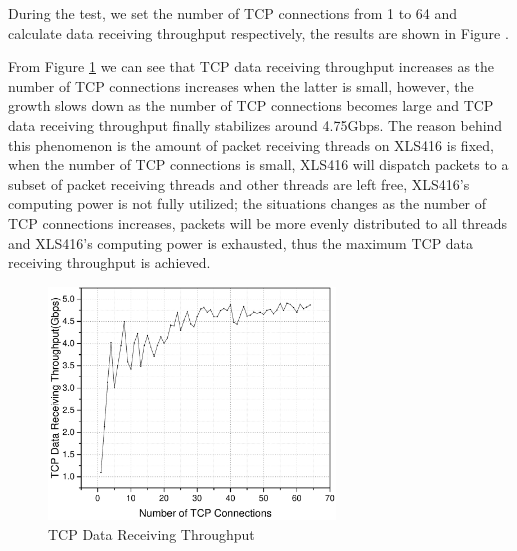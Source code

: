 \documentclass[conference]{IEEEtran}
\begin{document}
During the test, we set the number of TCP connections from 1 to 64 and calculate data receiving throughput respectively, the results are shown in Figure .

From Figure \ref{result} we can see that TCP data receiving throughput increases as the number of TCP connections increases when the latter is small, however, the growth slows down as the number of TCP connections becomes large and TCP data receiving throughput finally stabilizes around 4.75Gbps. The reason behind this phenomenon is the amount of packet receiving threads on XLS416 is fixed, when the number of TCP connections is small, XLS416 will dispatch packets to a subset of packet receiving threads and other threads are left free, XLS416's computing power is not fully utilized; the situations changes as the number of TCP connections increases, packets will be more evenly distributed to all threads and XLS416's computing power is exhausted, thus the maximum TCP data receiving throughput is achieved.
\begin{figure}[!t]
\centering
\includegraphics[width=3.0in]{oldresult}
\caption{TCP Data Receiving Throughput}
\label{result}
\end{figure}
\end{document}
